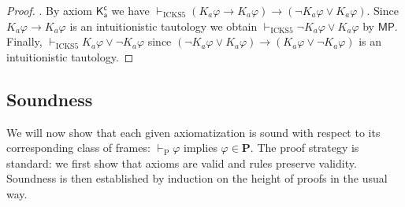 \documentclass{myifcolog}
\newcommand\C {C}
\newcommand{\K}{K}
\newcommand\A{\mathsf{A}}
\newcommand{\agi}{a}
\newcommand{\E}{E}
\newcommand{\ICK}{\mathsf{ICK}}
\newcommand{\LICK}{\mathcal{L}_{\ICK}}
\newcommand{\hickss}{\mathrm{ICKS5}}
\newcommand{\hickp}{\mathrm{P}}
\newtheorem{lemma}[theorem]{Lemma}
\numberwithin{theorem}{section}
\begin{document}
\begin{proof}
    . By axiom $\mathsf{\K_\agi^c}$ we have $\vdash_\hickss (\K_\agi \varphi \rightarrow \K_\agi \varphi) \rightarrow (\neg \K_\agi \varphi \vee \K_\agi \varphi)$. Since $\K_\agi \varphi \rightarrow \K_\agi \varphi$ is an intuitionistic tautology we obtain $\vdash_\hickss \neg \K_\agi \varphi \vee \K_\agi \varphi$ by $\mathsf{MP}$. Finally, $\vdash_\hickss {\K_\agi \varphi \vee \neg  \K_\agi \varphi}$ since $(\neg \K_\agi \varphi \vee \K_\agi \varphi) \to (\K_\agi \varphi \vee \neg \K_\agi \varphi)$ is an intuitionistic tautology.
\end{proof}





\subsection{Soundness}

We will now show that each given axiomatization is sound with respect to its corresponding class of frames: $\vdash_\hickp \varphi$ implies $\varphi \in \mathbf{P}$. The proof strategy is standard: we first show that axioms are valid and rules preserve validity. Soundness is then established by induction on the height of proofs in the usual way.
\end{document}
